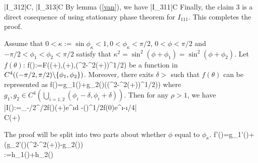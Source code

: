 \documentclass[12pt]{iopart}
\begin{document}
|I_{312}|\leq C,
|I_{313}|\leq C
\ee
By lemma (\ref{van}), we have
\be
|I_{311}|\leq C
\ee
Finally, the claim 3 is a direct cosequence of using stationary phase theorem for $I_{111}$. This completes the proof.
\finproof
\begin{lem}
	Assume that $0<\kappa:=\sin\phi_\kappa<1,0<\phi_\kappa<\pi/2$, $0<\phi<\pi/2$ and $-\pi/2<\phi_1<\phi_2<\pi/2$ satisfy that $\kappa^2=\sin^2(\phi+\phi_1)=\sin^2(\phi+\phi_2)$. Let $f(\theta)$:
	\be
	f(\theta):=F(\sin(\theta+\phi),\cos(\theta+\phi),(\kappa^2-\sin^2(\theta+\phi))^{1/2})
	\ee
	be a function in $C^4((-\pi/2,\pi/2)\backslash\{\phi_1,\phi_2\})$. Moreover, there exits $\delta>$ such that $f(\theta)$ can be represented as
	\be
	f(\theta)=g_1(\theta)+g_2(\theta)((\kappa^2-\sin^2(\theta+\phi))^{1/2}))
	\ee 
	where $g_1,g_2\in C^4(\bigcup\limits_{i=1,2}(\phi_i-\delta,\phi_i+\delta))$. Then for any $\rho>1$, we have
	\be\nn
	\bigg|I(\rho):=\int_{-\pi/2}^{\pi/2}f(\theta)\cos(\theta+\phi)e^{\i\rho\cos\theta}d\theta
	-\bigg(\frac{2\pi}{\rho}\bigg)^{1/2}f(0)\cos\phi e^{\i\rho-\i\pi/4}\bigg| \\
	\leq C(\cos\phi{}+\sin\phi{})
	\ee	
\end{lem}
\debproof
The proof will be split into two parts about whether $\phi$ equal to $\phi_\kappa$.
\be\hspace{-1cm}
f'(\theta)=g_1'(\theta)+(g_2'(\theta)(\kappa^2-\sin^2(\theta+\phi))-g_2(\theta))\\
:=h_1(\theta)+h_2(\theta)
\ee
\finproof
\end{document}

